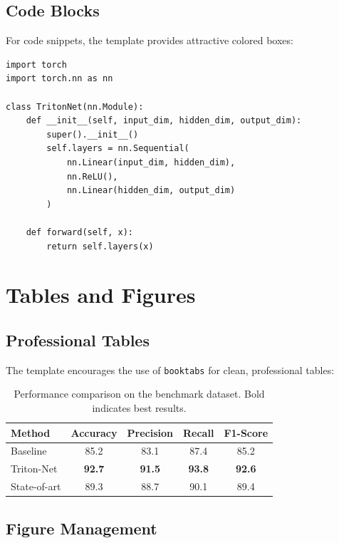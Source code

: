 \documentclass{triton}
\begin{document}
\subsection{Code Blocks}

For code snippets, the template provides attractive colored boxes:

\begin{tcolorbox}[colback=ucsdlightblue!10,colframe=ucsdblue,title=PyTorch Implementation Example]
\begin{verbatim}
import torch
import torch.nn as nn

class TritonNet(nn.Module):
    def __init__(self, input_dim, hidden_dim, output_dim):
        super().__init__()
        self.layers = nn.Sequential(
            nn.Linear(input_dim, hidden_dim),
            nn.ReLU(),
            nn.Linear(hidden_dim, output_dim)
        )
    
    def forward(self, x):
        return self.layers(x)
\end{verbatim}
\end{tcolorbox}

\section{Tables and Figures}

\subsection{Professional Tables}

The template encourages the use of \texttt{booktabs} for clean, professional tables:

\begin{table}[htbp]
\centering
\begin{tabular}{@{}lcccc@{}}
\toprule
\textbf{Method} & \textbf{Accuracy} & \textbf{Precision} & \textbf{Recall} & \textbf{F1-Score} \\
\midrule
Baseline & 85.2 & 83.1 & 87.4 & 85.2 \\
Triton-Net & \textbf{92.7} & \textbf{91.5} & \textbf{93.8} & \textbf{92.6} \\
State-of-art & 89.3 & 88.7 & 90.1 & 89.4 \\
\bottomrule
\end{tabular}
\caption{Performance comparison on the benchmark dataset. Bold indicates best results.}
\label{tab:results}
\end{table}

\subsection{Figure Management}
\end{document}
